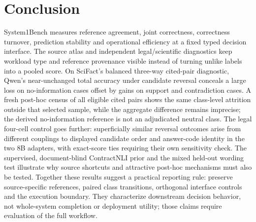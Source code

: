 \section{Conclusion}
System1Bench measures reference agreement, joint correctness, correctness turnover, prediction stability and operational efficiency at a fixed typed decision interface. The source atlas and independent legal/scientific diagnostics keep workload type and reference provenance visible instead of turning unlike labels into a pooled score. On SciFact's balanced three-way cited-pair diagnostic, Qwen's near-unchanged total accuracy under candidate reversal conceals a large loss on no-information cases offset by gains on support and contradiction cases. A fresh post-hoc census of all eligible cited pairs shows the same class-level attrition outside that selected sample, while the aggregate difference remains imprecise; the derived no-information reference is not an adjudicated neutral class. The legal four-cell control goes further: superficially similar reversal outcomes arise from different couplings to displayed candidate order and answer-code identity in the two 8B adapters, with exact-score ties requiring their own sensitivity check. The supervised, document-blind ContractNLI prior and the mixed held-out wording test illustrate why source shortcuts and attractive post-hoc mechanisms must also be tested. Together these results suggest a practical reporting rule: preserve source-specific references, paired class transitions, orthogonal interface controls and the execution boundary. They characterize downstream decision behavior, not whole-system completion or deployment utility; those claims require evaluation of the full workflow.
